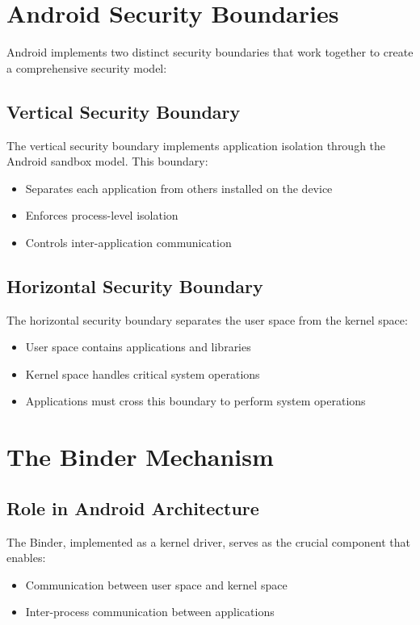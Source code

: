 \documentclass{article}
\begin{document}
\section{Android Security Boundaries}
Android implements two distinct security boundaries that work together to create a comprehensive security model:

\subsection{Vertical Security Boundary}
The vertical security boundary implements application isolation through the Android sandbox model. This boundary:
\begin{itemize}
    \item Separates each application from others installed on the device
    \item Enforces process-level isolation
    \item Controls inter-application communication
\end{itemize}

\subsection{Horizontal Security Boundary}
The horizontal security boundary separates the user space from the kernel space:
\begin{itemize}
    \item User space contains applications and libraries
    \item Kernel space handles critical system operations
    \item Applications must cross this boundary to perform system operations
\end{itemize}

\section{The Binder Mechanism}
\subsection{Role in Android Architecture}
The Binder, implemented as a kernel driver, serves as the crucial component that enables:
\begin{itemize}
    \item Communication between user space and kernel space
    \item Inter-process communication between applications
\end{itemize}
\end{document}
